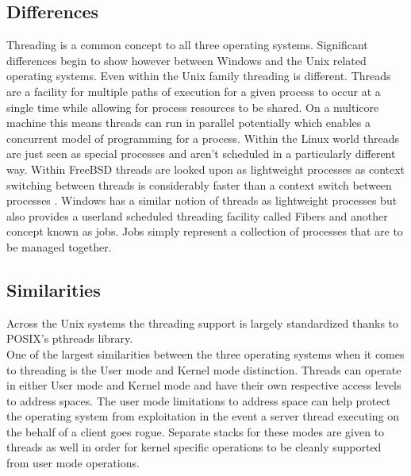 \documentclass[letterpaper,10pt,draftclsnofoot,onecolumn]{IEEEtran}
\begin{document}
\subsection{Differences}
Threading is a common concept to all three operating systems. Significant differences begin to show however between Windows and the Unix related operating systems. Even within the Unix family threading is different. Threads are a facility for multiple paths of execution for a given process to occur at a single time while allowing for process resources to be shared. On a multicore machine this means threads can run in parallel potentially which enables a concurrent model of programming for a process. Within the Linux world threads are just seen as special processes and aren’t scheduled in a particularly different way. Within FreeBSD threads are looked upon as lightweight processes as context switching between threads is considerably faster than a context switch between processes \cite{mccusick}. Windows has a similar notion of threads as lightweight processes but also provides a userland scheduled threading facility called Fibers and another concept known as jobs. Jobs simply represent a collection of processes that are to be managed together.\\
\subsection{Similarities}
Across the Unix systems the threading support is largely standardized thanks to POSIX’s pthreads library.\\

One of the largest similarities between the three operating systems when it comes to threading is the User mode and Kernel mode distinction. Threads can operate in either User mode and Kernel mode and have their own respective access levels to address spaces. The user mode limitations to address space can help protect the operating system from exploitation in the event a server thread executing on the behalf of a client goes rogue. Separate stacks for these modes are given to threads as well in order for kernel specific operations to be cleanly supported from user mode operations.\\
\newpage
\end{document}
